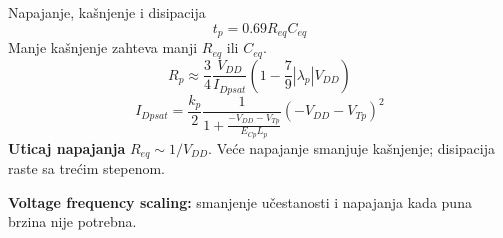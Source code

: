 \begin{frame}[label=09_2-s057]{Napajanje, kašnjenje i disipacija}
\[t_p=0.69R_{eq}C_{eq}\]
Manje kašnjenje zahteva manji $R_{eq}$ ili $C_{eq}$.\[R_p\approx\frac34\frac{V_{DD}}{I_{Dpsat}}\left(1-\frac79|\lambda_p|V_{DD}\right)\]
\[I_{Dpsat}=\frac{k_p}2\frac1{1+\frac{-V_{DD}-V_{Tp}}{E_{Cp}L_p}}(-V_{DD}-V_{Tp})^2\]
\textbf{Uticaj napajanja}
$R_{eq}\sim1/V_{DD}$.
Veće napajanje smanjuje kašnjenje; disipacija raste sa trećim stepenom.
\par\medskip\textbf{Voltage frequency scaling:} smanjenje učestanosti i napajanja kada puna brzina nije potrebna.
\end{frame}
